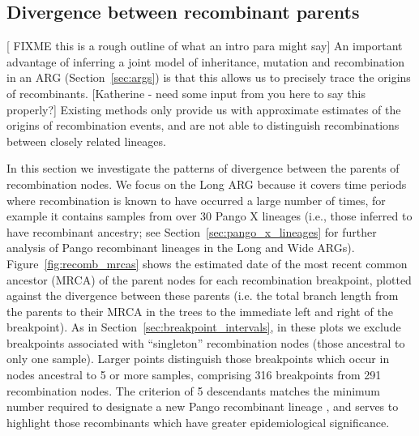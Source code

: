 \documentclass{article}
\begin{document}

\subsection{Divergence between recombinant parents}
\label{sec:parent_divergence}

[ FIXME this is a rough outline of what an intro para might say]
An important advantage of inferring a joint model of inheritance,
mutation and recombination in an ARG (Section~\ref{sec:args})
is that this allows us to precisely trace the origins of recombinants.
[Katherine - need some input from you here to say this properly?]
Existing methods only provide us with approximate estimates of
the origins of recombination events, and are not able to distinguish
recombinations between closely related lineages.

In this section we investigate the patterns of divergence between
the parents of recombination nodes.
We focus on the Long ARG because it covers time
periods where recombination is known to have occurred
a large number of times, for example it contains samples from over
30 Pango X lineages (i.e., those inferred
to have recombinant ancestry; see Section~\ref{sec:pango_x_lineages} for
further analysis of Pango recombinant lineages in the Long and Wide ARGs).
Figure~\ref{fig:recomb_mrcas} shows the estimated date of the most recent
common ancestor (MRCA) of the parent nodes for each recombination breakpoint,
plotted against the divergence between these parents (i.e. the
total branch length from the parents to their MRCA in the trees to
the immediate left and right of the breakpoint).
As in Section~\ref{sec:breakpoint_intervals}, in these plots we
exclude breakpoints associated with ``singleton'' recombination nodes
(those ancestral to only one sample).
Larger points distinguish those breakpoints which occur in nodes
ancestral to 5 or more samples, comprising 316 breakpoints from
291 recombination nodes. The criterion of 5 descendants matches the
minimum number required to designate a new Pango recombinant lineage
\citep{Rambaut2020-dw}, and serves to highlight those recombinants which
have greater epidemiological significance.
\end{document}
